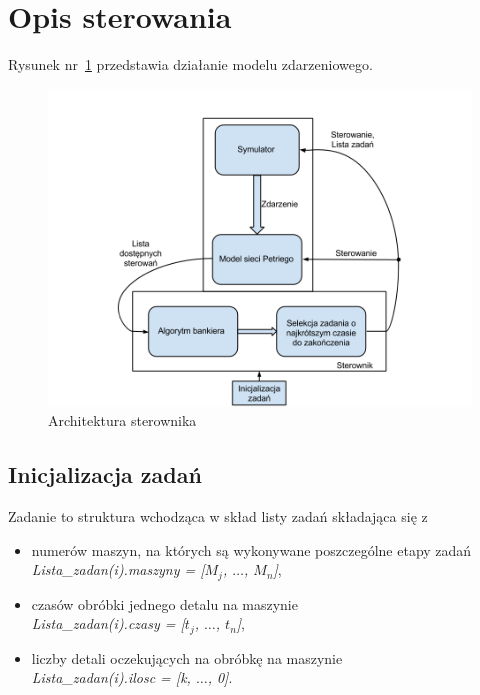 \documentclass[10pt, a4paper]{article}
\begin{document}
\section{Opis sterowania}
Rysunek nr~\ref{fig:alg} przedstawia działanie modelu zdarzeniowego.
 \begin{figure}[H]
  \begin{center}
    \includegraphics[width=1\textwidth]{./obrazki/alg.png}
    \caption{Architektura sterownika}
    \label{fig:alg}
  \end{center}
 \end{figure}
\subsection{Inicjalizacja zadań}
Zadanie to struktura wchodząca w skład listy zadań składająca się z
\begin{itemize}
\item  numerów maszyn, na których są wykonywane poszczególne etapy zadań\\
\textit{Lista\_zadan(i).maszyny = [$M_j$, $\dots$,  $M_n$]},
\item czasów obróbki jednego detalu na maszynie\\
\textit{Lista\_zadan(i).czasy = [$t_j$, $\dots$,  $t_n$]},
\item liczby detali oczekujących na obróbkę na maszynie\\
\textit{Lista\_zadan(i).ilosc   = [k, $\dots$, 0]}.
\label{lista_zad}
\end{itemize}
\end{document}
